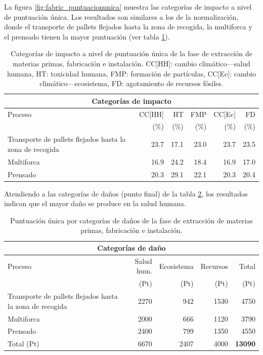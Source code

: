 La figura \ref{fig:fabric_puntuacionunica} muestra las categorías de impacto a nivel de puntuación única. Los resultados son similares a los de la normalización, donde el transporte de pallets flejados hasta la zona de recogida, la multiforca y el prensado tienen la mayor puntuación (ver tabla \ref{categoriasimpactofabricacionpuntunica}).

\begin{table}[!htb]
\centering
\begin{tabular}{p{4cm}rrrrr}
\toprule
\multicolumn{6}{c}{Categorías de impacto}\\
\midrule
Proceso & CC[HH] & HT & FMP & CC[Ec] & FD\\
 &  (\%) & (\%) & (\%) & (\%) & (\%)\\
\midrule
Transporte de pallets flejados hasta la zona de recogida & 23.7 & 17.1 & 23.0 & 23.7 & 23.5\\
Multiforca & 16.9 & 24.2 & 18.4 & 16.9 & 17.0\\
Prensado & 20.3 & 29.1 & 22.1 & 20.3 & 20.4\\
\bottomrule
\end{tabular}
\caption[Categorías de impacto a nivel de puntuación única de la fase de extracción de materias primas, fabricación e instalación.]{Categorías de impacto a nivel de puntuación única de la fase de extracción de materias primas, fabricación e instalación. CC[HH]: cambio climático—salud humana, HT: toxicidad humana, FMP: formación de partículas, CC[Ec]: cambio climático—ecosistema, FD: agotamiento de recursos fósiles.}
\label{categoriasimpactofabricacionpuntunica}
\end{table}

Atendiendo a las categorías de daños (punto final) de la tabla \ref{categoriasdanosfabricacion}, los resultados indican que el mayor daño se produce en la salud humana.

\begin{table}[!htb]
\centering
\begin{tabular}{p{6cm}rrrr}
\toprule
\multicolumn{5}{c}{Categorías de daño}\\
\midrule
Proceso & Salud hum. & Ecosistema & Recursos & Total\\
 & (Pt) & (Pt) &  (Pt) & (Pt)\\
\midrule
Transporte de pallets flejados hasta la zona de recogida & 2270 & 942 & 1530 & 4750\\
Multiforca & 2000 & 666 & 1120 & 3790\\
Prensado & 2400 & 799 & 1350 & 4550\\
\midrule
Total (Pt) & 6670 & 2407 & 4000 & \textbf{13090}\\
\bottomrule
\end{tabular}
\caption{Puntuación única por categorías de daños de la fase de extracción de materias primas, fabricación e instalación.}
\label{categoriasdanosfabricacion}
\end{table}

